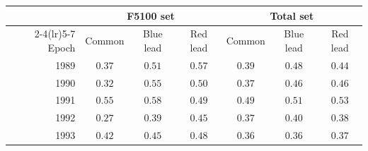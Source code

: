 \begin{tabular}{rcccccc}
\toprule
 & \multicolumn{3}{c}{F5100 set} & \multicolumn{3}{c}{Total set} \\
\cmidrule(lr){2-4}\cmidrule(lr){5-7}
Epoch & Common & Blue lead & Red lead & Common & Blue lead & Red lead \\
\midrule
1989 & $0.37$ & $0.51$ & $0.57$ & $0.39$ & $0.48$ & $0.44$ \\
1990 & $0.32$ & $0.55$ & $0.50$ & $0.37$ & $0.46$ & $0.46$ \\
1991 & $0.55$ & $0.58$ & $0.49$ & $0.49$ & $0.51$ & $0.53$ \\
1992 & $0.27$ & $0.39$ & $0.45$ & $0.37$ & $0.40$ & $0.38$ \\
1993 & $0.42$ & $0.45$ & $0.48$ & $0.36$ & $0.36$ & $0.37$ \\
\bottomrule
\end{tabular}
